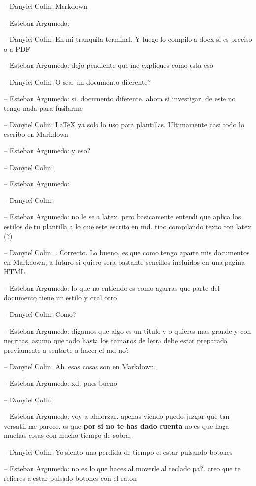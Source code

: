-- Danyiel Colin: Markdown

-- Esteban Argumedo:

-- Danyiel Colin: En mi tranquila terminal. Y luego lo compilo a docx si
es preciso o a PDF

-- Esteban Argumedo: dejo pendiente que me expliques como esta eso

-- Danyiel Colin: O sea, un documento diferente?

-- Esteban Argumedo: si. documento diferente. ahora si investigar. de
este no tengo nada para fusilarme

-- Danyiel Colin: LaTeX ya solo lo uso para plantillas. Ultimamente casi
todo lo escribo en Markdown

-- Esteban Argumedo: y eso?

-- Danyiel Colin:

-- Esteban Argumedo:

-- Danyiel Colin:

-- Esteban Argumedo: no le se a latex. pero basicamente entendi que
aplica los estilos de tu plantilla a lo que este escrito en md. tipo
compilando texto con latex (?)

-- Danyiel Colin: . Correcto. Lo bueno, es que como tengo aparte mis
documentos en Markdown, a futuro si quiero sera bastante sencillos
incluirlos en una pagina HTML

-- Esteban Argumedo: lo que no entiendo es como agarras que parte del
documento tiene un estilo y cual otro

-- Danyiel Colin: Como?

-- Esteban Argumedo: digamos que algo es un titulo y o quieres mas
grande y con negritas. asumo que todo hasta los tamanos de letra debe
estar preparado previamente a sentarte a hacer el md no?

-- Danyiel Colin: Ah, esas cosas son en Markdown.

-- Esteban Argumedo: xd. pues bueno

-- Danyiel Colin:

-- Esteban Argumedo: voy a almorzar. apenas viendo puedo juzgar que tan
versatil me parece. es que \textbf{por si no te has dado cuenta} no es
que haga muchas cosas con mucho tiempo de sobra.

-- Danyiel Colin: Yo siento una perdida de tiempo el estar pulsando
botones

-- Esteban Argumedo: no es lo que haces al moverle al teclado pa?. creo
que te refieres a estar pulsado botones con el raton

